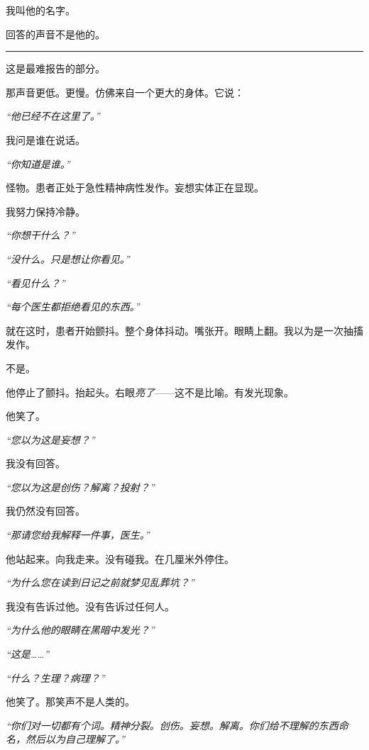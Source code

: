\noindent 我叫他的名字。

\noindent 回答的声音不是他的。

\vspace{0.5em}\noindent\rule{\textwidth}{0.5pt}\vspace{0.5em}

\noindent 这是最难报告的部分。

\noindent 那声音更低。更慢。仿佛来自一个更大的身体。它说：

\noindent \textit{“他已经不在这里了。”}

\noindent 我问是谁在说话。

\noindent \textit{“你知道是谁。”}

\noindent 怪物。患者正处于急性精神病性发作。妄想实体正在显现。

\noindent 我努力保持冷静。

\noindent \textit{“你想干什么？”}

\noindent \textit{“没什么。只是想让你看见。”}

\noindent \textit{“看见什么？”}

\noindent \textit{“每个医生都拒绝看见的东西。”}

\noindent 就在这时，患者开始颤抖。整个身体抖动。嘴张开。眼睛上翻。我以为是一次抽搐发作。

\noindent 不是。

\noindent 他停止了颤抖。抬起头。右眼\textit{亮了}——这不是比喻。有发光现象。

\noindent 他笑了。

\noindent \textit{“您以为这是妄想？”}

\noindent 我没有回答。

\noindent \textit{“您以为这是创伤？解离？投射？”}

\noindent 我仍然没有回答。

\noindent \textit{“那请您给我解释一件事，医生。”}

\noindent 他站起来。向我走来。没有碰我。在几厘米外停住。

\noindent \textit{“为什么您在读到日记之前就梦见乱葬坑？”}

\noindent 我没有告诉过他。没有告诉过任何人。

\noindent \textit{“为什么他的眼睛在黑暗中发光？”}

\noindent \textit{“这是……”}

\noindent \textit{“什么？生理？病理？”}

\noindent 他笑了。那笑声不是人类的。

\noindent \textit{“你们对一切都有个词。精神分裂。创伤。妄想。解离。你们给不理解的东西命名，然后以为自己理解了。”}

